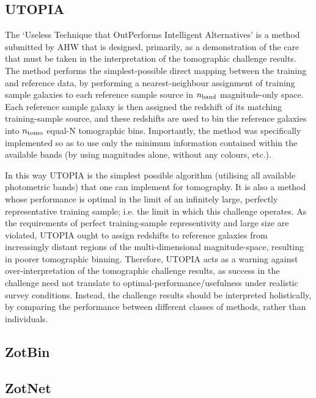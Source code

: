 \documentclass[twocolumn,twocolappendix]{aastex63}
\begin{document}
\subsection{ {\sc UTOPIA} }

The `Useless Technique that OutPerforms Intelligent Alternatives' is a method
submitted by AHW that is designed,  primarily, as a demonstration of the care
that must be taken in the interpretation of the tomographic challenge results. 
The method performs  the simplest-possible direct mapping between the training
and reference data, by performing a nearest-neighbour  assignment of training
sample galaxies to each reference sample source in $n_{\rm band}$ magnitude-only
space. Each reference  sample galaxy is then assigned the redshift of its
matching training-sample source, and these redshifts are  used to bin the
reference galaxies into $n_{\rm tomo}$ equal-N tomographic bins. Importantly,
the method was specifically  implemented so as to use only the minimum
information contained within the available bands (by using magnitudes alone,
without  any colours, etc.). 

In this way UTOPIA is the simplest possible algorithm (utilising all available
photometric bands) that one can  implement for tomography. It is also a method
whose performance is optimal in the limit of an infinitely large,  perfectly
representative training sample; i.e. the limit in which this challenge operates.
As the requirements of perfect  training-sample representivity and large size
are violated, UTOPIA ought to assign redshifts to reference  galaxies from
increasingly distant regions of the multi-dimensional magnitude-space, resulting
in poorer tomographic binning.  Therefore, UTOPIA acts as a warning against
over-interpretation of the tomographic challenge results, as success in the
challenge  need not translate to optimal-performance/usefulness under realistic
survey conditions. Instead, the challenge results should be interpreted
holistically, by comparing the performance between different classes of methods,
rather than individuals. 


\subsection{ {\sc ZotBin} }


\subsection{ {\sc ZotNet} }
\end{document}
